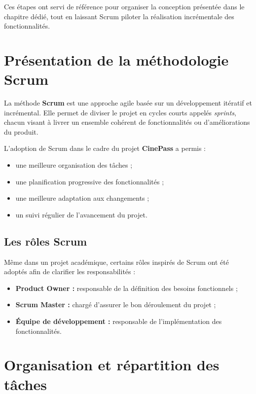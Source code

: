 \documentclass[12pt]{report}
\begin{document}
Ces étapes ont servi de référence pour organiser la conception présentée dans le
chapitre dédié, tout en laissant Scrum piloter la réalisation incrémentale des
fonctionnalités.

\section{Présentation de la méthodologie Scrum}

La méthode \textbf{Scrum} est une approche agile basée sur un développement
itératif et incrémental. Elle permet de diviser le projet en cycles courts
appelés \textit{sprints}, chacun visant à livrer un ensemble cohérent de
fonctionnalités ou d’améliorations du produit.

L’adoption de Scrum dans le cadre du projet \textbf{CinePass} a permis :

\begin{itemize}
    \item une meilleure organisation des tâches ;
    \item une planification progressive des fonctionnalités ;
    \item une meilleure adaptation aux changements ;
    \item un suivi régulier de l’avancement du projet.
\end{itemize}

\subsection{Les rôles Scrum}

Même dans un projet académique, certains rôles inspirés de Scrum ont été adoptés
afin de clarifier les responsabilités :

\begin{itemize}
    \item \textbf{Product Owner :} responsable de la définition des besoins fonctionnels ;
    \item \textbf{Scrum Master :} chargé d’assurer le bon déroulement du projet ;
    \item \textbf{Équipe de développement :} responsable de l’implémentation des fonctionnalités.
\end{itemize}


\section{Organisation et répartition des tâches}
\end{document}
